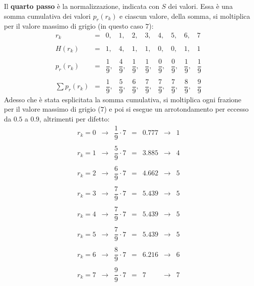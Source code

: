 \documentclass[a4paper]{article}
\begin{document}
	\noindent
	Il \textbf{quarto passo} è la normalizzazione, indicata con $S$ dei valori. Essa è una somma cumulativa dei valori $p_{r}\left(r_{k}\right)$ e ciascun valore, della somma, si moltiplica per il valore massimo di grigio (in questo caso $7$):
	\begin{equation*}
		\begin{array}{rccccccccc}
			r_{k} 						& = & 0,& 1,& 2,& 3,& 4,& 5,& 6,& 7 \\
			\\
			H\left(r_{k}\right) 		& = & 1,& 4,& 1,& 1,& 0,& 0,& 1,& 1 \\
			\\
			p_{r}\left(r_{k}\right) 	& = & \dfrac{1}{9},& \dfrac{4}{9},& \dfrac{1}{9},& \dfrac{1}{9},& \dfrac{0}{9},& \dfrac{0}{9},& \dfrac{1}{9},& \dfrac{1}{9} \\
			\\
			\sum p_{r}\left(r_{k}\right)& = & \dfrac{1}{9},& \dfrac{5}{9},& \dfrac{6}{9},& \dfrac{7}{9},& \dfrac{7}{9},& \dfrac{7}{9},& \dfrac{8}{9},& \dfrac{9}{9}
		\end{array}
	\end{equation*}
	Adesso che è stata esplicitata la somma cumulativa, si moltiplica ogni frazione per il valore massimo di grigio ($7$) e poi si esegue un arrotondamento per eccesso da $0.5$ a $0.9$, altrimenti per difetto:
	\begin{equation*}
		\begin{array}{lllllll}
			r_{k} = 0 & \longrightarrow & \dfrac{1}{9} \cdot 7 & = & 0.777 & \longrightarrow & 1 \\
			\\
			r_{k} = 1 & \longrightarrow & \dfrac{5}{9} \cdot 7 & = & 3.885 & \longrightarrow & 4 \\
			\\
			r_{k} = 2 & \longrightarrow & \dfrac{6}{9} \cdot 7 & = & 4.662 & \longrightarrow & 5 \\
			\\
			r_{k} = 3 & \longrightarrow & \dfrac{7}{9} \cdot 7 & = & 5.439 & \longrightarrow & 5 \\
			\\
			r_{k} = 4 & \longrightarrow & \dfrac{7}{9} \cdot 7 & = & 5.439 & \longrightarrow & 5 \\
			\\
			r_{k} = 5 & \longrightarrow & \dfrac{7}{9} \cdot 7 & = & 5.439 & \longrightarrow & 5 \\
			\\
			r_{k} = 6 & \longrightarrow & \dfrac{8}{9} \cdot 7 & = & 6.216 & \longrightarrow & 6 \\
			\\
			r_{k} = 7 & \longrightarrow & \dfrac{9}{9} \cdot 7 & = & 7 & \longrightarrow & 7
		\end{array}
	\end{equation*}\newline
	
\end{document}
